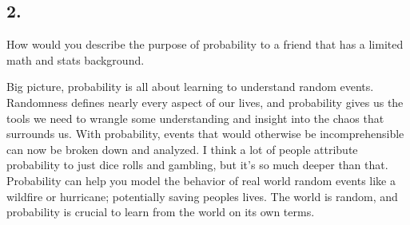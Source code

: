 \subsection*{2.}

How would you describe the purpose of probability to a friend that has a limited math and stats background.

Big picture, probability is all about learning to understand random events. Randomness defines nearly every aspect of our lives, and probability gives us the tools we need to wrangle some understanding and insight into the chaos that surrounds us. With probability, events that would otherwise be incomprehensible can now be broken down and analyzed. I think a lot of people attribute probability to just dice rolls and gambling, but it's so much deeper than that. Probability can help you model the behavior of real world random events like a wildfire or hurricane; potentially saving peoples lives. The world is random, and probability is crucial to learn from the world on its own terms.
